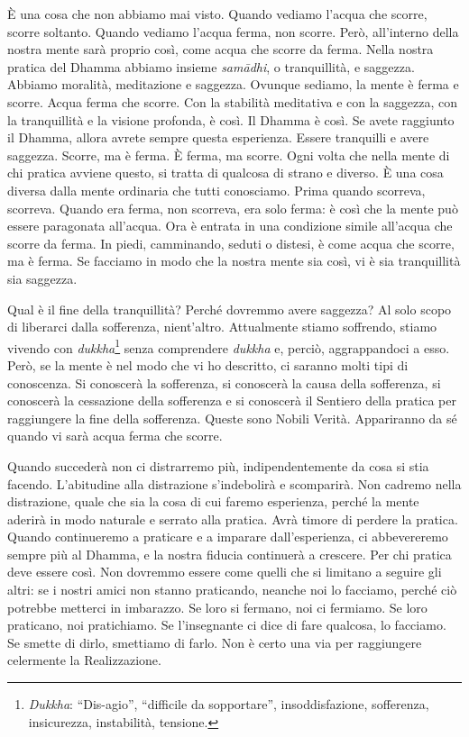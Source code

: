 È una cosa che non abbiamo mai visto. Quando vediamo l'acqua che scorre,
scorre soltanto. Quando vediamo l'acqua ferma, non scorre. Però,
all'interno della nostra mente sarà proprio così, come acqua che scorre
da ferma. Nella nostra pratica del Dhamma abbiamo insieme
\emph{samādhi}, o tranquillità, e saggezza. Abbiamo moralità,
meditazione e saggezza. Ovunque sediamo, la mente è ferma e scorre.
Acqua ferma che scorre. Con la stabilità meditativa e con la saggezza,
con la tranquillità e la visione profonda, è così. Il Dhamma è così. Se
avete raggiunto il Dhamma, allora avrete sempre questa esperienza.
Essere tranquilli e avere saggezza. Scorre, ma è ferma. È ferma, ma
scorre. Ogni volta che nella mente di chi pratica avviene questo, si
tratta di qualcosa di strano e diverso. È una cosa diversa dalla mente
ordinaria che tutti conosciamo. Prima quando scorreva, scorreva. Quando
era ferma, non scorreva, era solo ferma: è così che la mente può essere
paragonata all'acqua. Ora è entrata in una condizione simile all'acqua
che scorre da ferma. In piedi, camminando, seduti o distesi, è come
acqua che scorre, ma è ferma. Se facciamo in modo che la nostra mente
sia così, vi è sia tranquillità sia saggezza.

Qual è il fine della tranquillità? Perché dovremmo avere saggezza? Al
solo scopo di liberarci dalla sofferenza, nient'altro. Attualmente
stiamo soffrendo, stiamo vivendo con \emph{dukkha}\footnote{\emph{Dukkha}:
  ``Dis-agio'', ``difficile da sopportare'', insoddisfazione,
  sofferenza, insicurezza, instabilità, tensione.} senza comprendere
\emph{dukkha} e, perciò, aggrappandoci a esso. Però, se la mente è nel
modo che vi ho descritto, ci saranno molti tipi di conoscenza. Si
conoscerà la sofferenza, si conoscerà la causa della sofferenza, si
conoscerà la cessazione della sofferenza e si conoscerà il Sentiero
della pratica per raggiungere la fine della sofferenza. Queste sono
Nobili Verità. Appariranno da sé quando vi sarà acqua ferma che scorre.

Quando succederà non ci distrarremo più, indipendentemente da cosa si
stia facendo. L'abitudine alla distrazione s'indebolirà e scomparirà.
Non cadremo nella distrazione, quale che sia la cosa di cui faremo
esperienza, perché la mente aderirà in modo naturale e serrato alla
pratica. Avrà timore di perdere la pratica. Quando continueremo a
praticare e a imparare dall'esperienza, ci abbevereremo sempre più al
Dhamma, e la nostra fiducia continuerà a crescere. Per chi pratica deve
essere così. Non dovremmo essere come quelli che si limitano a seguire
gli altri: se i nostri amici non stanno praticando, neanche noi lo
facciamo, perché ciò potrebbe metterci in imbarazzo. Se loro si fermano,
noi ci fermiamo. Se loro praticano, noi pratichiamo. Se l'insegnante ci
dice di fare qualcosa, lo facciamo. Se smette di dirlo, smettiamo di
farlo. Non è certo una via per raggiungere celermente la Realizzazione.

